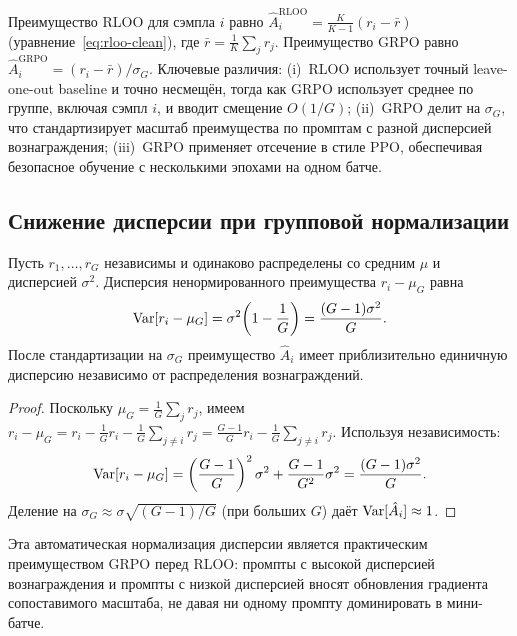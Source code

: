 Преимущество RLOO для сэмпла $i$ равно $\hat{A}_i^{\mathrm{RLOO}} = \frac{K}{K-1}(r_i - \bar{r})$ (уравнение~\eqref{eq:rloo-clean}), где $\bar{r} = \frac{1}{K}\sum_j r_j$. Преимущество GRPO равно $\hat{A}_i^{\mathrm{GRPO}} = (r_i - \bar{r}) / \sigma_G$. Ключевые различия: (i)~RLOO использует точный leave-one-out baseline и точно несмещён, тогда как GRPO использует среднее по группе, включая сэмпл $i$, и вводит смещение $O(1/G)$; (ii)~GRPO делит на $\sigma_G$, что стандартизирует масштаб преимущества по промптам с разной дисперсией вознаграждения; (iii)~GRPO применяет отсечение в стиле PPO, обеспечивая безопасное обучение с несколькими эпохами на одном батче.

\subsection{Снижение дисперсии при групповой нормализации}

\begin{proposition}
\label{prop:grpo-variance}
Пусть $r_1, \ldots, r_G$ независимы и одинаково распределены со средним $\mu$ и дисперсией $\sigma^2$. Дисперсия ненормированного преимущества $r_i - \mu_G$ равна
\begin{equation}
\label{eq:grpo-var-unnorm}
\operatorname{Var}[r_i - \mu_G] = \sigma^2\!\left(1 - \frac{1}{G}\right) = \frac{(G-1)\sigma^2}{G}.
\end{equation}
После стандартизации на $\sigma_G$ преимущество $\hat{A}_i$ имеет приблизительно единичную дисперсию независимо от распределения вознаграждений.
\end{proposition}

\begin{proof}
Поскольку $\mu_G = \frac{1}{G}\sum_j r_j$, имеем $r_i - \mu_G = r_i - \frac{1}{G}r_i - \frac{1}{G}\sum_{j \neq i} r_j = \frac{G-1}{G}r_i - \frac{1}{G}\sum_{j \neq i} r_j$. Используя независимость:
\[
\operatorname{Var}[r_i - \mu_G] = \left(\frac{G-1}{G}\right)^2 \sigma^2 + \frac{G-1}{G^2}\sigma^2 = \frac{(G-1)\sigma^2}{G}.
\]
Деление на $\sigma_G \approx \sigma\sqrt{(G-1)/G}$ (при больших $G$) даёт $\operatorname{Var}[\hat{A}_i] \approx 1$.
\end{proof}

Эта автоматическая нормализация дисперсии является практическим преимуществом GRPO перед RLOO: промпты с высокой дисперсией вознаграждения и промпты с низкой дисперсией вносят обновления градиента сопоставимого масштаба, не давая ни одному промпту доминировать в мини-батче.

